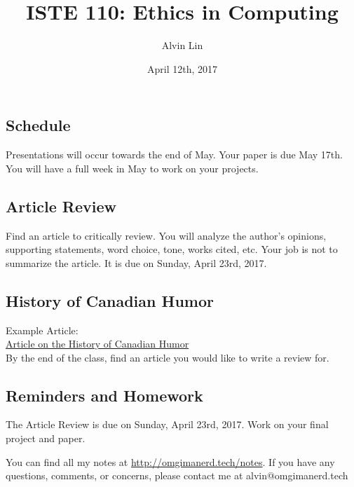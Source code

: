 \documentclass[letterpaper, 12pt]{article}
\title{ISTE 110: Ethics in Computing}
\author{Alvin Lin}
\date{April 12th, 2017}
\begin{document}
\maketitle

\subsection*{Schedule}
Presentations will occur towards the end of May. Your paper is due May 17th.
You will have a full week in May to work on your projects.

\subsection*{Article Review}
Find an article to critically review. You will analyze the author's opinions,
supporting statements, word choice, tone, works cited, etc. Your job is not
to summarize the article. It is due on Sunday, April 23rd, 2017.

\subsection*{History of Canadian Humor}
Example Article: \\
\href{http://www.vanityfair.com/culture/2013/01/history-canadian-humor}
{Article on the History of Canadian Humor} \\
By the end of the class, find an article you would like to write a review for.

\subsection*{Reminders and Homework}
The Article Review is due on Sunday, April 23rd, 2017.
Work on your final project and paper.

\begin{center}
  You can find all my notes at \url{http://omgimanerd.tech/notes}. If you have
  any questions, comments, or concerns, please contact me at
  alvin@omgimanerd.tech
\end{center}
\end{document}
